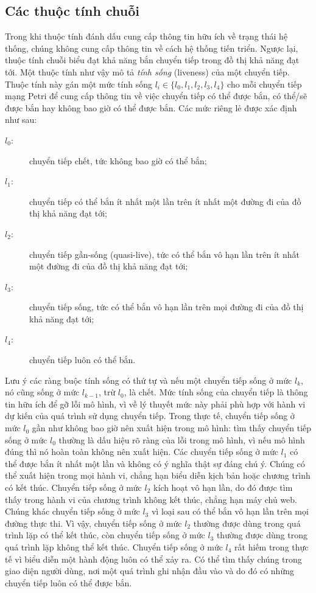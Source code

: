 \subsection{Các thuộc tính chuỗi}
Trong khi thuộc tính đánh dấu cung cấp thông tin hữu ích về trạng thái hệ thống, chúng không cung cấp thông tin về cách hệ thống tiến triển. Ngược lại, thuộc tính chuỗi biểu đạt khả năng bắn chuyển tiếp trong đồ thị khả năng đạt tới. Một thuộc tính như vậy mô tả \emph{tính sống} (liveness) của một chuyển tiếp. Thuộc tính này gán một mức tính sống $l_i\in\{l_0,l_1,l_2,l_3,l_4\}$ cho mỗi chuyển tiếp mạng Petri để cung cấp thông tin về việc chuyển tiếp có thể được bắn, có thể/sẽ được bắn hay không bao giờ có thể được bắn. Các mức riêng lẻ được xác định như sau:
\begin{description}
\item[$l_0$:] chuyển tiếp chết, tức không bao giờ có thể bắn;
\item[$l_1$:] chuyển tiếp có thể bắn ít nhất một lần trên ít nhất một đường đi của đồ thị khả năng đạt tới;
\item[$l_2$:] chuyển tiếp gần-sống (quasi-live), tức có thể bắn vô hạn lần trên ít nhất một đường đi của đồ thị khả năng đạt tới;
\item[$l_3$:] chuyển tiếp sống, tức có thể bắn vô hạn lần trên mọi đường đi của đồ thị khả năng đạt tới;
\item[$l_4$:] chuyển tiếp luôn có thể bắn.
\end{description}

Lưu ý các ràng buộc tính sống có thứ tự và nếu một chuyển tiếp sống ở mức $l_k$, nó cũng sống ở mức $l_{k-1}$, trừ $l_0$, là chết. Mức tính sống của chuyển tiếp là thông tin hữu ích để gỡ lỗi mô hình, vì về lý thuyết mức này phải phù hợp với hành vi dự kiến của quá trình sử dụng chuyển tiếp. Trong thực tế, chuyển tiếp sống ở mức $l_0$ gần như không bao giờ nên xuất hiện trong mô hình: tìm thấy chuyển tiếp sống ở mức $l_0$ thường là dấu hiệu rõ ràng của lỗi trong mô hình, vì nếu mô hình đúng thì nó hoàn toàn không nên xuất hiện. Các chuyển tiếp sống ở mức $l_1$ có thể được bắn ít nhất một lần và không có ý nghĩa thật sự đáng chú ý. Chúng có thể xuất hiện trong mọi hành vi, chẳng hạn biểu diễn kịch bản hoặc chương trình có kết thúc. Chuyển tiếp sống ở mức $l_2$ kích hoạt vô hạn lần, do đó được tìm thấy trong hành vi của chương trình không kết thúc, chẳng hạn máy chủ web. Chúng khác chuyển tiếp sống ở mức $l_3$ vì loại sau có thể bắn vô hạn lần trên mọi đường thực thi. Vì vậy, chuyển tiếp sống ở mức $l_2$ thường được dùng trong quá trình lặp có thể kết thúc, còn chuyển tiếp sống ở mức $l_3$ thường được dùng trong quá trình lặp không thể kết thúc. Chuyển tiếp sống ở mức $l_4$ rất hiếm trong thực tế vì biểu diễn một hành động luôn có thể xảy ra. Có thể tìm thấy chúng trong giao diện người dùng, nơi một quá trình ghi nhận đầu vào và do đó có những chuyển tiếp luôn có thể được bắn.

